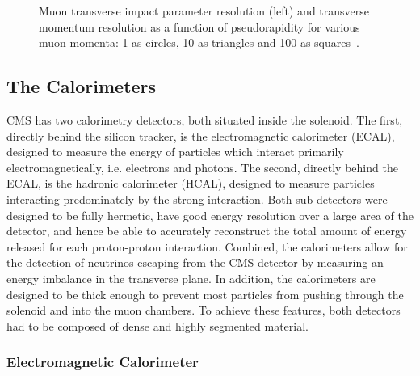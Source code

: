 \begin{figure}[!htb]
\begin{center}
\caption[
Muon transverse impact parameter resolution and transverse momentum
resolution as a function of pseudorapidity
]{\label{fig:cms_tkres}
Muon transverse impact parameter
resolution (left) and transverse momentum resolution as a function of
pseudorapidity for various muon momenta: 1 \GeV as circles, 10 \GeV as
triangles and 100 \GeV as squares~\cite{trackingperformance}.
}
\end{center}
\end{figure} 

\subsection{The Calorimeters}
\label {sec:cms_calo}
CMS has two calorimetry detectors, both situated inside the solenoid. The
first, directly behind the silicon tracker, is the electromagnetic calorimeter
(ECAL), designed to measure the energy of particles which interact primarily
electromagnetically, i.e. electrons and photons. The second, directly behind
the ECAL, is the hadronic calorimeter (HCAL), designed to measure particles
interacting predominately by the strong interaction. Both sub-detectors were
designed to be fully hermetic, have good energy resolution over a large
area of the detector, and hence be able to accurately reconstruct the total
amount of energy released for each proton-proton interaction. Combined, the
calorimeters allow for the detection of neutrinos escaping from the CMS
detector by measuring an energy imbalance in the transverse plane. In addition,
the calorimeters are designed to be thick enough to prevent most particles
from pushing through the solenoid and into the muon chambers. To achieve these
features, both detectors had to be composed of dense and highly segmented
material.

\subsubsection{Electromagnetic Calorimeter}
\label {sec:cms_ecal}

